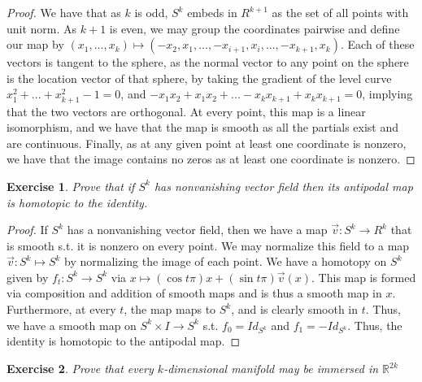 \documentclass{article}
\newtheorem{exercise}{Exercise}
\begin{document}
                \begin{proof}
                  We have that as $k$ is odd, $S^{k}$ embeds in $R^{k+1}$ as the set of all points with unit norm. As $k+1$ is even, we may group the coordinates pairwise and define our map by $(x_{1},...,x_{k}) \mapsto (-x_{2},x_{1},...,-x_{i+1},x_{i},...,-x_{k+1},x_{k})$. Each of these vectors is tangent to the sphere, as the normal vector to any point on the sphere is the location vector of that sphere, by taking the gradient of the level curve $x_{1}^{2}+...+x_{k+1}^{2} - 1 = 0$, and $-x_{1}x_{2} + x_{1}x_{2} + ... -x_{k}x_{k+1} + x_{k}x_{k+1} = 0$, implying that the two vectors are orthogonal. At every point, this map is a linear isomorphism, and we have that the map is smooth as all the partials exist and are continuous. Finally, as at any given point at least one coordinate is nonzero, we have that the image contains no zeros as at least one coordinate is nonzero.
                \end{proof}

                \begin{exercise}
                  Prove that if $S^{k}$ has nonvanishing vector field then its antipodal map is homotopic to the identity.
                \end{exercise}
                \begin{proof}
                  If $S^{k}$ has a nonvanishing vector field, then we have a map $\vec{v}: S^{k} \to R^{k}$ that is smooth s.t. it is nonzero on every point. We may normalize this field to a map $\vec{v}: S^{k} \mapsto S^{k}$ by normalizing the image of each point. We have a homotopy on $S^{k}$ given by $f_{t}:S^{k} \to S^{k}$ via $x \mapsto (\cos t\pi)x + (\sin t\pi)\vec{v}(x)$. This map is formed via composition and addition of smooth maps and is thus a smooth map in $x$. Furthermore, at every $t$, the map maps to $S^{k}$, and is clearly smooth in $t$. Thus, we have a smooth map on $S^{k}\times I \to S^{k}$ s.t. $f_{0} = Id_{S^{k}}$ and $f_{1} = -Id_{S^{k}}$. Thus, the identity is homotopic to the antipodal map.                   
                \end{proof}

                \begin{exercise}
                  Prove that every $k$-dimensional manifold may be immersed in $\mathbb{R}^{2k}$
                \end{exercise}
\end{document}
